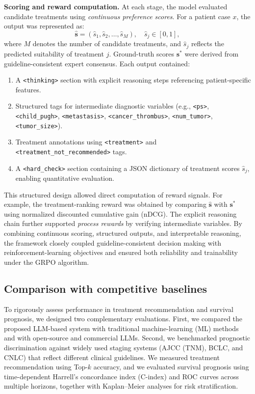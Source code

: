 \documentclass{article}
\begin{document}
\textbf{Scoring and reward computation.}
At each stage, the model evaluated candidate treatments using \emph{continuous preference scores}. For a patient case $x$, the output was represented as:
\begin{equation}
    \hat{\mathbf{s}} = (\hat{s}_1, \hat{s}_2, \ldots, \hat{s}_M), \quad \hat{s}_j \in [0,1],
\end{equation}
where $M$ denotes the number of candidate treatments, and $\hat{s}_j$ reflects the predicted suitability of treatment $j$. Ground-truth scores $\mathbf{s}^\ast$ were derived from guideline-consistent expert consensus. Each output contained:  
\begin{enumerate}
    \item A \texttt{<thinking>} section with explicit reasoning steps referencing patient-specific features.  
    \item Structured tags for intermediate diagnostic variables (e.g., \texttt{<ps>}, \texttt{<child\_pugh>}, \texttt{<metastasis>}, \texttt{<cancer\_thrombus>}, \texttt{<num\_tumor>}, \texttt{<tumor\_size>}).  
    \item Treatment annotations using \texttt{<treatment>} and \texttt{<treatment\_not\_recommended>} tags.  
    \item A \texttt{<hard\_check>} section containing a JSON dictionary of treatment scores $\hat{s}_j$, enabling quantitative evaluation.  
\end{enumerate}

This structured design allowed direct computation of reward signals. For example, the treatment-ranking reward was obtained by comparing $\hat{\mathbf{s}}$ with $\mathbf{s}^\ast$ using normalized discounted cumulative gain (nDCG). The explicit reasoning chain further supported \emph{process rewards} by verifying intermediate variables. By combining continuous scoring, structured outputs, and interpretable reasoning, the framework closely coupled guideline-consistent decision making with reinforcement-learning objectives and ensured both reliability and trainability under the GRPO algorithm.




\subsection{Comparison with competitive baselines}
To rigorously assess performance in treatment recommendation and survival prognosis, we designed two complementary evaluations. First, we compared the proposed LLM-based system with traditional machine-learning (ML) methods and with open-source and commercial LLMs. Second, we benchmarked prognostic discrimination against widely used staging systems (AJCC (TNM), BCLC, and CNLC) that reflect different clinical guidelines. We measured treatment recommendation using Top-$k$ accuracy, and we evaluated survival prognosis using time-dependent Harrell’s concordance index (C-index) and ROC curves across multiple horizons, together with Kaplan–Meier analyses for risk stratification.
\end{document}
